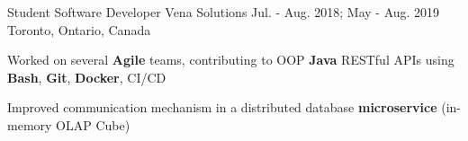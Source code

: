 \begin{cventries}
{\begin{cvitems}
      \end{cvitems}
    }

  \cventry
    {Student Software Developer} %
    {Vena Solutions} %
    {Jul. - Aug. 2018; May - Aug. 2019} %
    {Toronto, Ontario, Canada} %
    {
      \begin{cvitems} %
        \item{Worked on several \textbf{Agile} teams, contributing to OOP \textbf{Java} RESTful APIs using \textbf{Bash}, \textbf{Git}, \textbf{Docker}, CI/CD}
        \item{Improved communication mechanism in a distributed database \textbf{microservice} (in-memory OLAP Cube)}
      \end{cvitems}
    }


\end{cventries}
